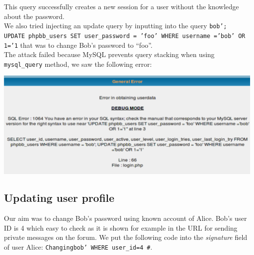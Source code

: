 \documentclass[12pt, a4paper, pdflatex]{article}
\begin{document}
This query successfully creates a new session for a user without the knowledge about the password.\\

We also tried injecting an update query by inputting into the query
\texttt{bob'; UPDATE phpbb\_users SET user\_password = 'foo' WHERE username ='bob' OR 1='1} 
that was to change Bob's password to ``foo''.\\
The attack failed because MySQL prevents query stacking when using \texttt{mysql\_query} method, we saw the following error:

\includegraphics[width=.95\textwidth]{gfx/sql/updateerr.png}

\subsection{Updating user profile}

Our aim was to change Bob's password using known account of Alice. Bob's user ID is 4 which easy to check as it is shown for example in the URL for sending private messages on the forum. We put the following code into the \emph{signature} field of user Alice: \texttt{Changingbob' WHERE user\_id=4 \#}.\\
\end{document}
